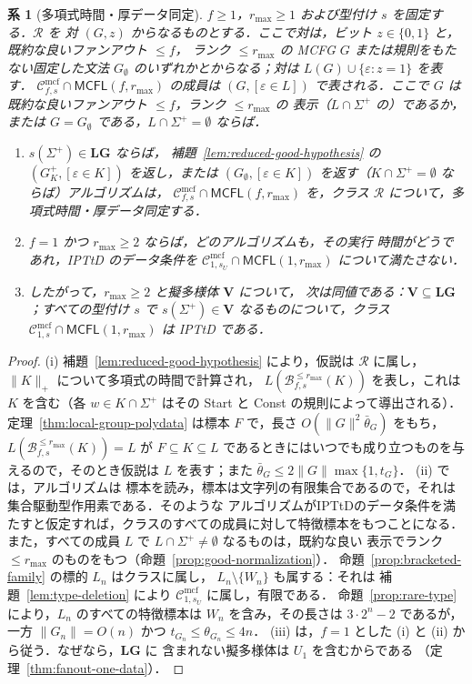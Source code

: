 \documentclass[11pt,a4paper]{ltjsarticle}
\numberwithin{equation}{section}
\theoremstyle{plain}
\newtheorem{corollary}[theorem]{系}
\theoremstyle{definition}
\theoremstyle{remark}
\newcommand{\Cmcf}[2]{\mathcal{C}^{\mathrm{mcf}}_{#1,#2}}
\newcommand{\eps}{\varepsilon}
\theoremstyle{plain}
\begin{document}
\begin{corollary}[多項式時間・厚データ同定]
\label{cor:iptd}
$f\ge1$，$r_{\max}\ge1$ および型付け $s$ を固定する．$\mathcal R$ を
対 $(G,z)$ からなるものとする．ここで対は，ビット $z\in\{0,1\}$ と，既約な良いファンアウト $\le f$，
ランク $\le r_{\max}$ の MCFG $G$ または規則をもたない固定した文法 $G_\emptyset$ のいずれかとからなる；対は
$L(G)\cup\{\eps:z=1\}$ を表す．
$\Cmcf{f}{s}\cap\mathsf{MCFL}(f,r_{\max})$ の成員は
$(G,[\eps\in L])$ で表される．ここで $G$ は既約な良いファンアウト $\le f$，ランク $\le r_{\max}$ の
表示（$L\cap\Sigma^+$ の）であるか，または $G=G_\emptyset$ である，$L\cap\Sigma^+=\emptyset$ ならば．
\begin{enumerate}[label=\textup{(\roman*)},leftmargin=*]
\item $s(\Sigma^+)\in\mathbf{LG}$ ならば，
補題~\ref{lem:reduced-good-hypothesis} の $(G^+_K,[\eps\in K])$ を返し，または
$(G_\emptyset,[\eps\in K])$ を返す（$K\cap\Sigma^+=\emptyset$ ならば）アルゴリズムは，
$\Cmcf{f}{s}\cap\mathsf{MCFL}(f,r_{\max})$ を，クラス $\mathcal R$ について，多項式時間・厚データ同定する．
\item $f=1$ かつ $r_{\max}\ge2$ ならば，どのアルゴリズムも，その実行
時間がどうであれ，IPTtD のデータ条件を
$\Cmcf{1}{s_U}\cap\mathsf{MCFL}(1,r_{\max})$ について満たさない．
\item したがって，$r_{\max}\ge2$ と擬多様体 $\mathbf V$ について，
次は同値である：$\mathbf V\subseteq\mathbf{LG}$；すべての型付け $s$
で $s(\Sigma^+)\in\mathbf V$ なるものについて，クラス
$\Cmcf{1}{s}\cap\mathsf{MCFL}(1,r_{\max})$ は IPTtD である．
\end{enumerate}
\end{corollary}

\begin{proof}
(i) 補題~\ref{lem:reduced-good-hypothesis} により，仮説は
$\mathcal R$ に属し，$\|K\|_+$ について多項式の時間で計算され，
$L(\mathcal B^{\le r_{\max}}_{f,s}(K))$ を表し，これは $K$ を含む（各 $w\in K\cap\Sigma^+$
はその Start と Const の規則によって導出される）．
定理~\ref{thm:local-group-polydata} は標本 $F$ で，長さ
$O(\|G\|^2\bar\theta_G)$ をもち，$L(\mathcal B^{\le r_{\max}}_{f,s}(K))=L$ が
$F\subseteq K\subseteq L$ であるときにはいつでも成り立つものを与えるので，そのとき仮説は $L$ を表す；また
$\bar\theta_G\le2\|G\|\max\{1,t_G\}$．
(ii) \cite[Definition~2.12]{EyraudHeinzYoshinaka2016} では，アルゴリズムは
標本を読み，標本は文字列の有限集合であるので，それは集合駆動型作用素である．そのような
アルゴリズムがIPTtDのデータ条件を満たすと仮定すれば，クラスのすべての成員に対して特徴標本をもつことになる．また，すべての成員 $L$ で $L\cap\Sigma^+\ne\emptyset$ なるものは，既約な良い
表示でランク $\le r_{\max}$ のものをもつ（命題~\ref{prop:good-normalization}）．
命題~\ref{prop:bracketed-family} の標的 $L_n$ はクラスに属し，
$L_n\setminus\{W_n\}$ も属する：それは
補題~\ref{lem:type-deletion} により $\Cmcf{1}{s_U}$ に属し，有限である．
命題~\ref{prop:rare-type} により，$L_n$ のすべての特徴標本は
$W_n$ を含み，その長さは $3\cdot2^n-2$ であるが，一方 $\|G_n\|=O(n)$ かつ $t_{G_n}\le\theta_{G_n}\le4n$．
(iii) は，$f=1$ とした (i) と (ii) から従う．なぜなら，$\mathbf{LG}$ に
含まれない擬多様体は $U_1$ を含むからである
（定理~\ref{thm:fanout-one-data}）．
\end{proof}
\end{document}
